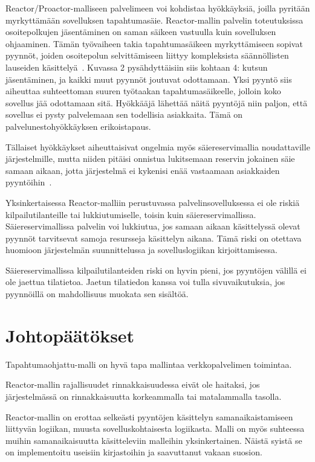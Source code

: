 \documentclass[finnish]{tktltiki2}
\theoremstyle{definition}
\theoremstyle{remark}
\begin{document}
Reactor/Proactor-malliseen palvelimeen voi kohdistaa hyökkäyksiä, joilla pyritään
myrkyttämään sovelluksen tapahtumasäie. Reactor-mallin palvelin toteutuksissa
osoitepolkujen jäsentäminen on saman säikeen vastuulla kuin sovelluksen ohjaaminen.
Tämän työvaiheen takia
tapahtumasäikeen myrkyttämiseen sopivat pyynnöt,
joiden osoitepolun selvittämiseen liittyy kompleksista
säännöllisten lauseiden käsittelyä~\cite{davis_case_2017}.
Kuvassa 2 pysähdyttäisiin siis kohtaan 4: kutsun jäsentäminen, ja
kaikki muut pyynnöt joutuvat odottamaan.
Yksi pyyntö siis aiheuttaa suhteettoman suuren työtaakan 
tapahtumasäikeelle, jolloin koko sovellus jää odottamaan sitä.
Hyökkääjä lähettää näitä pyyntöjä niin paljon, että sovellus 
ei pysty palvelemaan sen todellisia asiakkaita. Tämä
on palvelunestohyökkäyksen erikoistapaus.

Tällaiset hyökkäykset aiheuttaisivat ongelmia myös säiereservimallia
noudattaville järjestelmille, mutta niiden pitäisi onnistua
lukitsemaan reservin jokainen säie samaan aikaan, jotta
järjestelmä ei kykenisi enää vastaamaan asiakkaiden pyyntöihin~\cite{davis_case_2017}.

Yksinkertaisessa Reactor-malliin perustuvassa palvelinsovelluksessa ei ole 
riskiä kilpailutilanteille tai lukkiutumiselle, toisin kuin säiereservimallissa.
Säiereservimallissa palvelin voi lukkiutua, jos samaan aikaan käsittelyssä olevat
pyynnöt tarvitsevat samoja resursseja käsittelyn aikana. Tämä riski on otettava
huomioon järjestelmän suunnittelussa ja sovelluslogiikan kirjoittamisessa.

Säiereservimallissa kilpailutilanteiden riski on hyvin pieni, jos pyyntöjen
välillä ei ole jaettua tilatietoa. Jaetun tilatiedon kanssa voi tulla
sivuvaikutuksia, jos pyynnöillä on mahdollisuus muokata sen sisältöä.

\section{Johtopäätökset}

Tapahtumaohjattu-malli on hyvä tapa mallintaa verkkopalvelimen
toimintaa.

Reactor-mallin rajallisuudet rinnakkaisuudessa
eivät ole haitaksi, jos järjestelmässä on rinnakkaisuutta
korkeammalla tai matalammalla tasolla.

Reactor-mallin on erottaa
selkeästi pyyntöjen käsittelyn
samanaikaistamiseen liittyvän
logiikan, muusta sovelluskohtaisesta logiikasta.
Malli on myös suhteessa muihin samanaikaisuutta
käsitteleviin malleihin yksinkertainen.
Näistä syistä se on implementoitu useisiin
kirjastoihin ja saavuttanut vakaan suosion.
\end{document}
